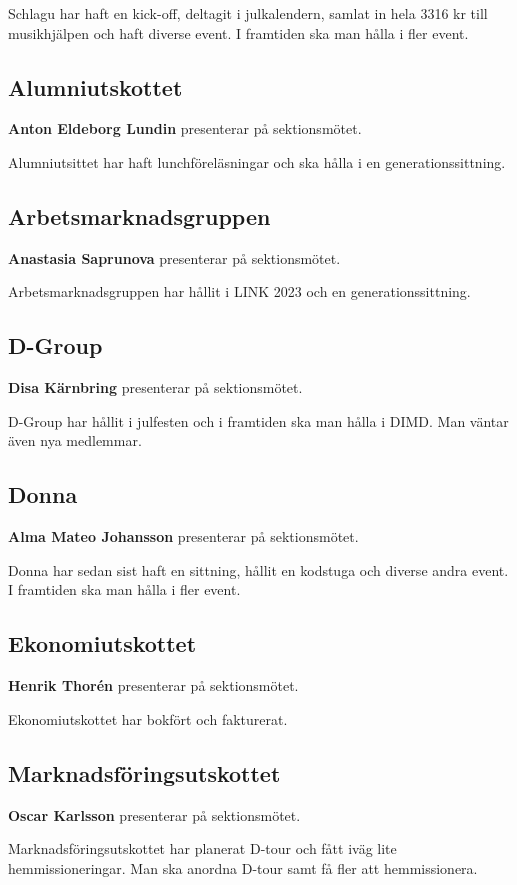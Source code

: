 \documentclass[../protokoll-vintermote-2024.tex]{subfiles}
\begin{document}
Schlagu har haft en kick-off, deltagit i julkalendern, samlat in hela 3316 kr till musikhjälpen och haft diverse event. I framtiden ska man hålla i fler event.

\subsection{Alumniutskottet}
\textbf{Anton Eldeborg Lundin} presenterar på sektionsmötet. 

Alumniutsittet har haft lunchföreläsningar och ska hålla i en generationssittning.

\subsection{Arbetsmarknadsgruppen}
\textbf{Anastasia Saprunova} presenterar på sektionsmötet. 

Arbetsmarknadsgruppen har hållit i LINK 2023 och en generationssittning.

\subsection{D-Group}
\textbf{Disa Kärnbring} presenterar på sektionsmötet.

D-Group har hållit i julfesten och i framtiden ska man hålla i DIMD. Man väntar även nya medlemmar.

\subsection{Donna}
\textbf{Alma Mateo Johansson} presenterar på sektionsmötet.

Donna har sedan sist haft en sittning, hållit en kodstuga och diverse andra event. I framtiden ska man hålla i fler event.

\subsection{Ekonomiutskottet}
\textbf{Henrik Thorén} presenterar på sektionsmötet.

Ekonomiutskottet har bokfört och fakturerat.

\subsection{Marknadsföringsutskottet}
\textbf{Oscar Karlsson} presenterar på sektionsmötet.

Marknadsföringsutskottet har planerat D-tour och fått iväg lite hemmissioneringar. Man ska anordna D-tour samt få fler att hemmissionera.
\end{document}
